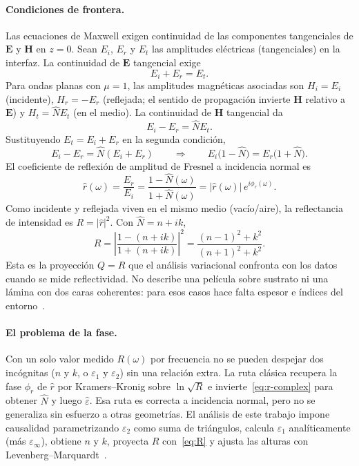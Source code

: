 \paragraph{Condiciones de frontera.}
Las ecuaciones de Maxwell exigen continuidad de las componentes tangenciales de $\mathbf{E}$ y $\mathbf{H}$ en $z=0$.
Sean $E_i$, $E_r$ y $E_t$ las amplitudes el\'ectricas (tangenciales) en la interfaz.
La continuidad de $\mathbf{E}$ tangencial exige
\begin{equation}
E_i+E_r=E_t.
\end{equation}
Para ondas planas con $\mu=1$, las amplitudes magn\'eticas asociadas son
$H_i=E_i$ (incidente), $H_r=-E_r$ (reflejada; el sentido de propagaci\'on invierte $\mathbf{H}$ relativo a $\mathbf{E}$)
y $H_t=\hat N E_t$ (en el medio).
La continuidad de $\mathbf{H}$ tangencial da
\begin{equation}
E_i-E_r=\hat N E_t.
\end{equation}
Sustituyendo $E_t=E_i+E_r$ en la segunda condici\'on,
\begin{equation}
E_i-E_r=\hat N(E_i+E_r)
\qquad\Longrightarrow\qquad
E_i\bigl(1-\hat N\bigr)=E_r\bigl(1+\hat N\bigr).
\end{equation}
El coeficiente de reflexi\'on de amplitud de Fresnel a incidencia normal es
\begin{equation}
\label{eq:r-complex}
\hat r(\omega)=\frac{E_r}{E_i}=\frac{1-\hat N(\omega)}{1+\hat N(\omega)}=\bigl|\hat r(\omega)\bigr|\,e^{i\phi_r(\omega)}.
\end{equation}
Como incidente y reflejada viven en el mismo medio (vac\'io/aire), la reflectancia de intensidad es
$R=|\hat r|^{2}$. Con $\hat N=n+ik$,
\begin{equation}
\label{eq:R}
R=\left|\frac{1-(n+ik)}{1+(n+ik)}\right|^{2}
=\frac{(n-1)^{2}+k^{2}}{(n+1)^{2}+k^{2}}.
\end{equation}
Esta es la proyecci\'on $Q=R$ que el an\'alisis variacional confronta con los datos cuando se mide reflectividad.
No describe una pel\'icula sobre sustrato ni una l\'amina con dos caras coherentes:
para esos casos hace falta espesor e \'indices del entorno~\cite{OpticalTechniques}.

\paragraph{El problema de la fase.}
Con un solo valor medido $R(\omega)$ por frecuencia no se pueden despejar dos inc\'ognitas
($n$ y $k$, o $\varepsilon_1$ y $\varepsilon_2$) sin una relaci\'on extra.
La ruta cl\'asica recupera la fase $\phi_r$ de $\hat r$ por Kramers--Kronig sobre $\ln\sqrt{R}$
e invierte~\eqref{eq:r-complex} para obtener $\hat N$ y luego $\hat\varepsilon$.
Esa ruta es correcta a incidencia normal, pero no se generaliza sin esfuerzo a otras geometr\'ias.
El an\'alisis de este trabajo impone causalidad parametrizando $\varepsilon_2$ como suma de tri\'angulos,
calcula $\varepsilon_1$ anal\'iticamente (m\'as $\varepsilon_\infty$), obtiene $n$ y $k$, proyecta $R$ con~\eqref{eq:R}
y ajusta las alturas con Levenberg--Marquardt~\cite{constrained}.

